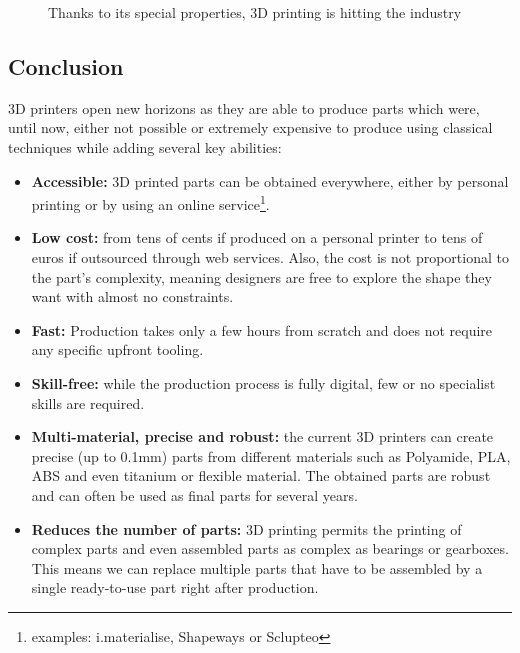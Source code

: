 \begin{figure}[tb]
\centering
    \hfil
    \caption{Thanks to its special properties, 3D printing is hitting the industry}
    \label{fig:industrie_printing}
\end{figure}



\subsection{Conclusion} %

3D printers open new horizons as they are able to produce parts which were, until now, either not possible or extremely expensive to produce using classical techniques while adding several key abilities:
\begin{itemize}
    \item \textbf{Accessible:} 3D printed parts can be obtained everywhere, either by personal printing or by using an online service\footnote{examples: i.materialise, Shapeways or Sclupteo}.
    \item \textbf{Low cost:}  from tens of cents if produced on a personal printer to tens of euros if outsourced through web services. Also, the cost is not proportional to the part’s complexity, meaning designers are free to explore the shape they want with almost no constraints.
    \item \textbf{Fast:} Production takes only a few hours from scratch and does not require any specific upfront tooling.
    \item \textbf{Skill-free:} while the production process is fully digital, few or no specialist skills are required.
    \item \textbf{Multi-material, precise and robust:} the current 3D printers can create precise (up to 0.1mm) parts from different materials such as Polyamide, PLA, ABS and even titanium or flexible material. The obtained parts are robust and can often be used as final parts for several years.
    \item \textbf{Reduces the number of parts:} 3D printing permits the printing of complex parts and even assembled parts as complex as bearings or gearboxes. This means we can replace multiple parts that have to be assembled by a single ready-to-use part right after production.
\end{itemize}


